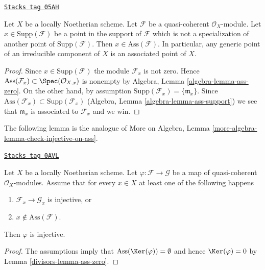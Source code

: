 \begin{lemma}
\label{divisors-lemma-minimal-support-in-ass}
\href{https://stacks.math.columbia.edu/tag/05AH}{\texttt{Stacks tag 05AH}}

Let $X$ be a locally Noetherian scheme.
Let $\mathcal{F}$ be a quasi-coherent $\mathcal{O}_X$-module.
Let $x \in \text{Supp}(\mathcal{F})$ be a point in the support
of $\mathcal{F}$ which is not a specialization of another point of
$\text{Supp}(\mathcal{F})$. Then $x \in \text{Ass}(\mathcal{F})$.
In particular, any generic point of an irreducible component of $X$
is an associated point of $X$.
\end{lemma}

\begin{proof}
Since $x \in \text{Supp}(\mathcal{F})$ the module $\mathcal{F}_x$
is not zero. Hence
$\text{Ass}(\mathcal{F}_x) \subset \Spec(\mathcal{O}_{X, x})$
is nonempty by
Algebra, Lemma \ref{algebra-lemma-ass-zero}.
On the other hand, by assumption
$\text{Supp}(\mathcal{F}_x) = \{\mathfrak m_x\}$.
Since
$\text{Ass}(\mathcal{F}_x) \subset \text{Supp}(\mathcal{F}_x)$
(Algebra, Lemma \ref{algebra-lemma-ass-support})
we see that $\mathfrak m_x$ is associated to $\mathcal{F}_x$
and we win.
\end{proof}

The following lemma is the analogue of
More on Algebra, Lemma \ref{more-algebra-lemma-check-injective-on-ass}.

\begin{lemma}
\label{divisors-lemma-check-injective-on-ass}
\href{https://stacks.math.columbia.edu/tag/0AVL}{\texttt{Stacks tag 0AVL}}

Let $X$ be a locally Noetherian scheme. Let
$\varphi : \mathcal{F} \to \mathcal{G}$ be a map of
quasi-coherent $\mathcal{O}_X$-modules.
Assume that for every $x \in X$
at least one of the following happens
\begin{enumerate}
\item $\mathcal{F}_x \to \mathcal{G}_x$ is injective, or
\item $x \not \in \text{Ass}(\mathcal{F})$.
\end{enumerate}
Then $\varphi$ is injective.
\end{lemma}

\begin{proof}

The assumptions imply that $\text{Ass}(\Ker(\varphi)) = \emptyset$
and hence $\Ker(\varphi) = 0$ by Lemma \ref{divisors-lemma-ass-zero}.
\end{proof}

